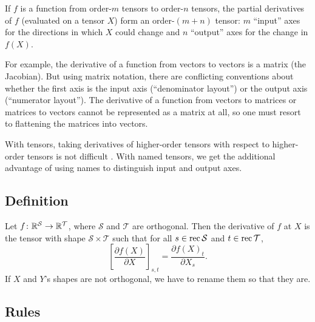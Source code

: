 \newcommand{\inp}[1]{#1^*}
\newcommand{\ddx}[1]{\frac{\partial #1}{\partial X}}
\newcommand{\ddxr}[1]{\frac{\partial #1}{\partial X_{\nmov{\mathcal{S}}{\mathcal{S}'}}}}

If $f$ is a function from order-$m$ tensors to order-$n$ tensors, the partial derivatives of $f$ (evaluated on a tensor $X$) form an order-$(m+n)$ tensor: $m$ ``input'' axes for the directions in which $X$ could change and $n$ ``output'' axes for the change in $f(X)$.

For example, the derivative of a function from vectors to vectors is a matrix (the Jacobian). But using matrix notation, there are conflicting conventions about whether the first axis is the input axis (``denominator layout'') or the output axis (``numerator layout''). The derivative of a function from vectors to matrices or matrices to vectors cannot be represented as a matrix at all, so one must resort to flattening the matrices into vectors.

With tensors, taking derivatives of higher-order tensors with respect to higher-order tensors is not difficult \citep{laue+:2018}. With named tensors, we get the additional advantage of using names to distinguish input and output axes.

\subsection{Definition}

Let $f \colon \mathbb{R}^\mathcal{S} \rightarrow \mathbb{R}^\mathcal{T}$, where $\mathcal{S}$ and $\mathcal{T}$ are orthogonal. Then the derivative of $f$ at $X$ is the tensor with shape $\mathcal{S} \times \mathcal{T}$ such that for all $s \in \operatorname{rec}\mathcal{S}$ and $t \in \operatorname{rec}\mathcal{T}$,
\begin{equation*}
  \left[\ddx{f(X)} \right]_{s,t} = \frac{\partial f(X)_t}{\partial X_s}.
\end{equation*}
If $X$ and $Y$'s shapes are not orthogonal, we have to rename them so that they are.

\subsection{Rules}


